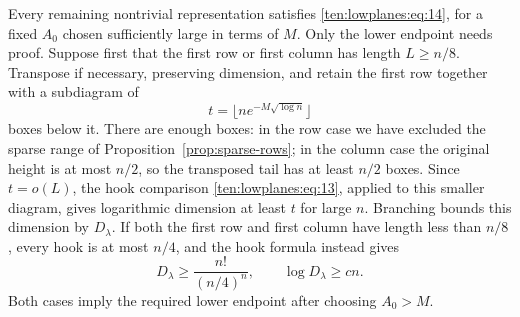 Every remaining nontrivial representation satisfies
\eqref{ten:lowplanes:eq:14}, for a fixed $A_0$ chosen sufficiently large in terms of $M$. Only the lower endpoint needs proof. Suppose first that the first row or first column has length $L\ge n/8$. Transpose if necessary, preserving dimension, and retain the first row together with a subdiagram of
\[
 t=\lfloor ne^{-M\sqrt{\log n}}\rfloor
\]
boxes below it. There are enough boxes: in the row case we have excluded the sparse range of Proposition~\ref{prop:sparse-rows}; in the column case the original height is at most $n/2$, so the transposed tail has at least $n/2$ boxes. Since $t=o(L)$, the hook comparison \eqref{ten:lowplanes:eq:13}, applied to this smaller diagram, gives logarithmic dimension at least $t$ for large $n$. Branching bounds this dimension by $D_\lambda$. If both the first row and first column have length less than $n/8$, every hook is at most $n/4$, and the hook formula instead gives
\[
 D_\lambda\ge\frac{n!}{(n/4)^n},\qquad \log D_\lambda\ge cn.
\]
Both cases imply the required lower endpoint after choosing $A_0>M$.

